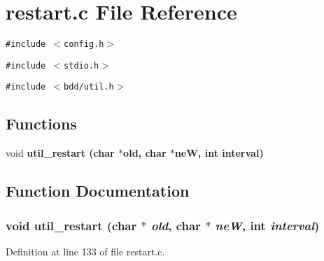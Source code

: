 \section{restart.c File Reference}
\label{restart_8c}
{\tt \#include $<$config.h$>$}\par
{\tt \#include $<$stdio.h$>$}\par
{\tt \#include $<$bdd/util.h$>$}\par
\subsection*{Functions}
\begin{CompactItemize}
\item 
void \bf{util\_\-restart} (char $\ast$old, char $\ast$ne\-W, int interval)
\end{CompactItemize}


\subsection{Function Documentation}
\subsubsection{\setlength{\rightskip}{0pt plus 5cm}void util\_\-restart (char $\ast$ {\em old}, char $\ast$ {\em ne\-W}, int {\em interval})}\label{restart_8c_6b3223658c7fa52f4731b053f3b96d5e}




Definition at line 133 of file restart.c.